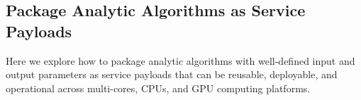 
\subsection{Package Analytic Algorithms as Service Payloads}
\label{sec:package}

Here we explore how to package analytic algorithms with well-defined
input and output parameters as service payloads that can be reusable,
deployable, and operational across multi-cores, CPUs, and GPU
computing platforms.


